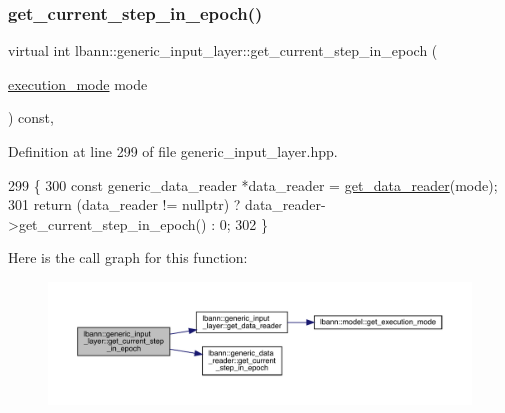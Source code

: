 \subsubsection{\texorpdfstring{get\+\_\+current\+\_\+step\+\_\+in\+\_\+epoch()}{get\_current\_step\_in\_epoch()}\hspace{0.1cm}{\footnotesize\ttfamily [1/2]}}
{\footnotesize\ttfamily virtual int lbann\+::generic\+\_\+input\+\_\+layer\+::get\+\_\+current\+\_\+step\+\_\+in\+\_\+epoch (\begin{DoxyParamCaption}\item[{\hyperlink{base_8hpp_a2781a159088df64ed7d47cc91c4dc0a8}{execution\+\_\+mode}}]{mode }\end{DoxyParamCaption}) const\hspace{0.3cm}{\ttfamily [inline]}, {\ttfamily [virtual]}}



Definition at line 299 of file generic\+\_\+input\+\_\+layer.\+hpp.


\begin{DoxyCode}
299                                                                    \{
300     \textcolor{keyword}{const} generic\_data\_reader *data\_reader = \hyperlink{classlbann_1_1generic__input__layer_aba732becdb02627e3ad4493ac19e8fb6}{get\_data\_reader}(mode);
301     \textcolor{keywordflow}{return} (data\_reader != \textcolor{keyword}{nullptr}) ? data\_reader->get\_current\_step\_in\_epoch() : 0;
302   \}
\end{DoxyCode}
Here is the call graph for this function\+:\nopagebreak
\begin{figure}[H]
\begin{center}
\leavevmode
\includegraphics[width=350pt]{classlbann_1_1generic__input__layer_abad654f945f62d4610f8afa597777713_cgraph}
\end{center}
\end{figure}
\mbox{\label{classlbann_1_1generic__input__layer_a660d82888a5c1eb72c2906d6367cbc35}} 
